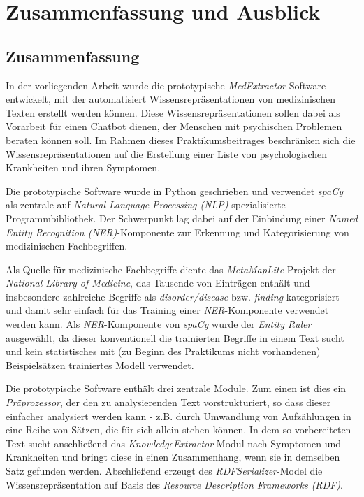 \chapter{Zusammenfassung und Ausblick}
\label{ch:zusammenfassung}


\section{Zusammenfassung}
\label{sec:Zusammenfassung} 

In der vorliegenden Arbeit wurde die prototypische \emph{MedExtractor}-Software entwickelt, mit der automatisiert Wissensrepräsentationen von medizinischen Texten erstellt werden können. Diese Wissensrepräsentationen sollen dabei als Vorarbeit für einen Chatbot dienen, der Menschen mit psychischen Problemen beraten können soll. Im Rahmen dieses Praktikumsbeitrages beschränken sich die Wissensrepräsentationen auf die Erstellung einer Liste von psychologischen Krankheiten und ihren Symptomen. 

Die prototypische Software wurde in Python geschrieben und verwendet \emph{spaCy} als zentrale auf \emph{Natural Language Processing (NLP)} spezialisierte Programmbibliothek. Der Schwerpunkt lag dabei auf der Einbindung einer \emph{Named Entity Recognition (NER)}-Komponente zur Erkennung und Kategorisierung von medizinischen Fachbegriffen.

Als Quelle für medizinische Fachbegriffe diente das \emph{MetaMapLite}-Projekt der \emph{National Library of Medicine}, das Tausende von Einträgen enthält und insbesondere zahlreiche Begriffe als \emph{disorder/disease} bzw. \emph{finding} kategorisiert und damit sehr einfach für das Training einer \emph{NER}-Komponente verwendet werden kann. Als \emph{NER}-Komponente von \emph{spaCy} wurde der \emph{Entity Ruler} ausgewählt, da dieser konventionell die trainierten Begriffe in einem Text sucht und kein statistisches mit (zu Beginn des Praktikums nicht vorhandenen) Beispielsätzen trainiertes Modell verwendet.

Die prototypische Software enthält drei zentrale Module. Zum einen ist dies ein \emph{Präprozessor}, der den zu analysierenden Text vorstrukturiert, so dass dieser einfacher analysiert werden kann - z.B. durch Umwandlung von Aufzählungen in eine Reihe von Sätzen, die für sich allein stehen können. In dem so vorbereiteten Text sucht anschließend das \emph{KnowledgeExtractor}-Modul nach Symptomen und Krankheiten und bringt diese in einen Zusammenhang, wenn sie in demselben Satz gefunden werden. Abschließend erzeugt des \emph{RDFSerializer}-Model die Wissensrepräsentation auf Basis des \emph{Resource Description Frameworks (RDF)}.

